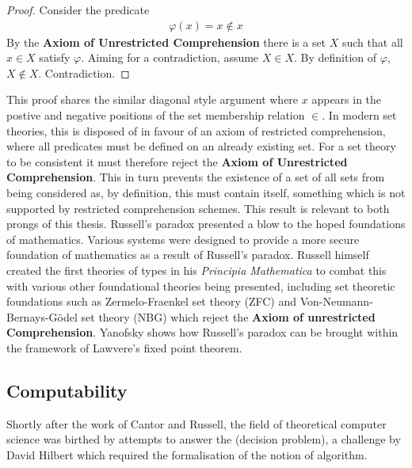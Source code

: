 \begin{proof}
    Consider the predicate
    \begin{align*}
        \varphi(x) = x \not\in x
    \end{align*}
    By the \textbf{Axiom of Unrestricted Comprehension} there is a set $X$ such
    that all $x \in X$ satisfy $\varphi$. Aiming for a contradiction, assume
    $X \in X$. By definition of $\varphi$, $X \not\in X$. Contradiction.
\end{proof}
This proof shares the similar diagonal style argument where $x$ appears in the
postive and negative positions of the set membership relation $\in$. In modern
set theories, this is disposed of in favour of an axiom of restricted
comprehension, where all predicates must be defined on an already existing set.
For a set theory to be consistent it must therefore reject the \textbf{Axiom of
Unrestricted Comprehension}. This in turn prevents the existence of a set of all
sets from being considered as, by definition, this must contain itself, something which is not
supported by restricted comprehension schemes. This result is relevant to both
prongs of this thesis. Russell's paradox presented a blow to the hoped
foundations of mathematics. Various systems were designed to provide a more
secure foundation of mathematics as a result of Russell's paradox. Russell
himself created the first theories of types in his \textit{Principia
Mathematica} \cite{russell25} to combat this with various other foundational
theories being presented, including set theoretic foundations such as
Zermelo-Fraenkel set theory (ZFC) and Von-Neumann-Bernays-G{\"o}del set theory
(NBG) which reject the \textbf{Axiom of unrestricted Comprehension}. Yanofsky
\cite{yanofsky2003universal} shows how Russell's paradox can be brought within
the framework of Lawvere's fixed point theorem.

\subsection{Computability}
Shortly after the work of Cantor and Russell, the field of theoretical computer
science was birthed by attempts to answer the \ent{} (decision
problem), a challenge by David Hilbert \cite{hilbert1928theoretische} which required the formalisation of the
notion of algorithm.

\subsubsection{\ent}

